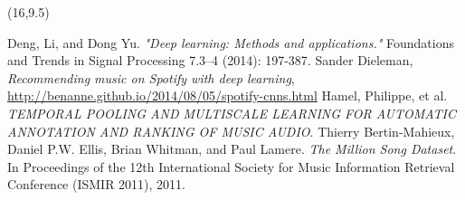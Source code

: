 \documentclass[a0]{a0poster}
\begin{document}
  \begin{textblock}{7}(16,9.5)
    \begin{thebibliography}{9}
      \sf
        Deng, Li, and Dong Yu. \emph{"Deep learning: Methods and applications."}
        Foundations and Trends in Signal Processing 7.3–4 (2014): 197-387.
        Sander Dieleman, \emph{Recommending music on Spotify with deep learning},
        \url{http://benanne.github.io/2014/08/05/spotify-cnns.html}
        Hamel, Philippe, et al. \emph{TEMPORAL POOLING AND MULTISCALE LEARNING
        FOR AUTOMATIC ANNOTATION AND RANKING OF MUSIC AUDIO}.
        Thierry Bertin-Mahieux, Daniel P.W. Ellis, Brian Whitman, and Paul
        Lamere. \emph{The Million Song Dataset}. In Proceedings of the 12th
        International Society for Music Information Retrieval Conference (ISMIR
        2011), 2011.
    \end{thebibliography}
  \end{textblock}
\end{document}
